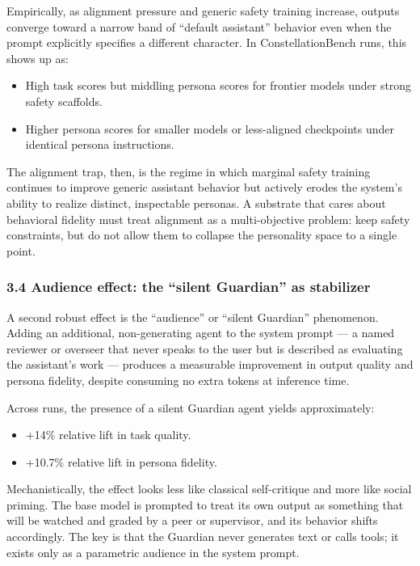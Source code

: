 Empirically, as alignment pressure and generic safety training increase,
outputs converge toward a narrow band of ``default assistant'' behavior
even when the prompt explicitly specifies a different character. In
ConstellationBench runs, this shows up as:

\begin{itemize}
\tightlist
\item
  High task scores but middling persona scores for frontier models under
  strong safety scaffolds.
\item
  Higher persona scores for smaller models or less-aligned checkpoints
  under identical persona instructions.
\end{itemize}

The alignment trap, then, is the regime in which marginal safety
training continues to improve generic assistant behavior but actively
erodes the system's ability to realize distinct, inspectable personas. A
substrate that cares about behavioral fidelity must treat alignment as a
multi-objective problem: keep safety constraints, but do not allow them
to collapse the personality space to a single point.

\subsubsection{3.4 Audience effect: the ``silent Guardian'' as
stabilizer}\label{audience-effect-the-silent-guardian-as-stabilizer}

A second robust effect is the ``audience'' or ``silent Guardian''
phenomenon. Adding an additional, non-generating agent to the system
prompt --- a named reviewer or overseer that never speaks to the user
but is described as evaluating the assistant's work --- produces a
measurable improvement in output quality and persona fidelity, despite
consuming no extra tokens at inference time.

Across runs, the presence of a silent Guardian agent yields
approximately:

\begin{itemize}
\tightlist
\item
  +14\% relative lift in task quality.
\item
  +10.7\% relative lift in persona fidelity.
\end{itemize}

Mechanistically, the effect looks less like classical self-critique and
more like social priming. The base model is prompted to treat its own
output as something that will be watched and graded by a peer or
supervisor, and its behavior shifts accordingly. The key is that the
Guardian never generates text or calls tools; it exists only as a
parametric audience in the system prompt.


